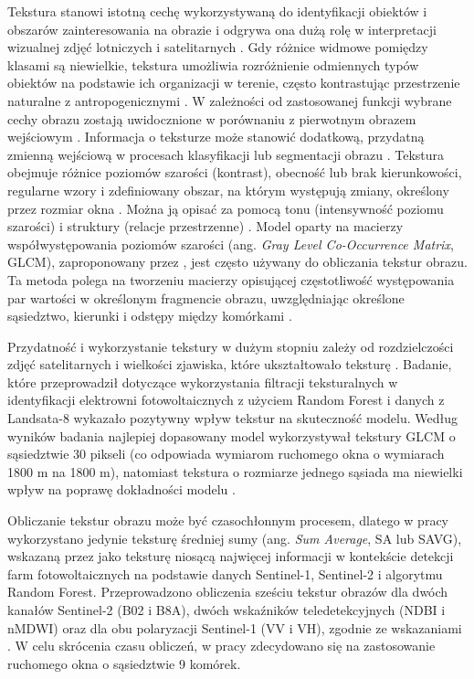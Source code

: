 \documentclass{amuthesis}
\begin{document}
Tekstura stanowi istotną cechę wykorzystywaną do identyfikacji obiektów
i obszarów zainteresowania na obrazie \autocite{haralick_1973_texture} i
odgrywa ona dużą rolę w interpretacji wizualnej zdjęć lotniczych i
satelitarnych \autocite{lewinski_2012_texture}. Gdy różnice widmowe
pomiędzy klasami są niewielkie, tekstura umożliwia rozróżnienie
odmiennych typów obiektów na podstawie ich organizacji w terenie, często
kontrastując przestrzenie naturalne z antropogenicznymi
\autocite{grass_r_texture}. W zależności od zastosowanej funkcji wybrane
cechy obrazu zostają uwidocznione w porównaniu z pierwotnym obrazem
wejściowym \autocite{lewinski_2012_texture}. Informacja o teksturze może
stanowić dodatkową, przydatną zmienną wejściową w procesach klasyfikacji
lub segmentacji obrazu
\autocite{gong_1992_spatial_features,mumby_2002_ikonos}. Tekstura
obejmuje różnice poziomów szarości (kontrast), obecność lub brak
kierunkowości, regularne wzory i zdefiniowany obszar, na którym
występują zmiany, określony przez rozmiar okna
\autocite{hall_beyer_2017_glcm,grass_r_texture}. Można ją opisać za
pomocą tonu (intensywność poziomu szarości) i struktury (relacje
przestrzenne) \autocite{grass_r_texture}. Model oparty na macierzy
współwystępowania poziomów szarości (ang. \emph{Gray Level Co-Occurrence
Matrix}, GLCM), zaproponowany przez \textcite{haralick_1973_texture},
jest często używany do obliczania tekstur obrazu. Ta metoda polega na
tworzeniu macierzy opisującej częstotliwość występowania par wartości w
określonym fragmencie obrazu, uwzględniając określone sąsiedztwo,
kierunki i odstępy między komórkami \autocite{kupidura_2019_texture}.

Przydatność i wykorzystanie tekstury w dużym stopniu zależy od
rozdzielczości zdjęć satelitarnych i wielkości zjawiska, które
ukształtowało teksturę \autocite{grass_r_texture}. Badanie, które
przeprowadził \textcite{zhang_2021_texture} dotyczące wykorzystania
filtracji teksturalnych w identyfikacji elektrowni fotowoltaicznych z
użyciem Random Forest i danych z Landsata-8 wykazało pozytywny wpływ
tekstur na skuteczność modelu. Według wyników badania najlepiej
dopasowany model wykorzystywał tekstury GLCM o sąsiedztwie 30 pikseli
(co odpowiada wymiarom ruchomego okna o wymiarach 1800 m na 1800 m),
natomiast tekstura o rozmiarze jednego sąsiada ma niewielki wpływ na
poprawę dokładności modelu \autocite{zhang_2021_texture}.

Obliczanie tekstur obrazu może być czasochłonnym procesem, dlatego w
pracy wykorzystano jedynie teksturę średniej sumy (ang. \emph{Sum
Average}, SA lub SAVG), wskazaną przez \textcite{wang_2022_pv} jako
teksturę niosącą najwięcej informacji w kontekście detekcji farm
fotowoltaicznych na podstawie danych Sentinel-1, Sentinel-2 i algorytmu
Random Forest. Przeprowadzono obliczenia sześciu tekstur obrazów dla
dwóch kanałów Sentinel-2 (B02 i B8A), dwóch wskaźników teledetekcyjnych
(NDBI i nMDWI) oraz dla obu polaryzacji Sentinel-1 (VV i VH), zgodnie ze
wskazaniami \textcite{wang_2022_pv}. W celu skrócenia czasu obliczeń, w
pracy zdecydowano się na zastosowanie ruchomego okna o sąsiedztwie 9
komórek.
\end{document}
